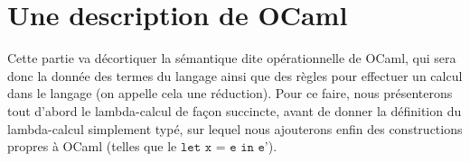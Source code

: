 \part{Une description de OCaml}

Cette partie va décortiquer la sémantique dite opérationnelle de OCaml, qui sera donc la donnée des termes du langage ainsi que des règles pour effectuer un calcul dans le langage (on appelle cela une réduction). Pour ce faire, nous présenterons tout d'abord le lambda-calcul de façon succincte, avant de donner la définition du lambda-calcul simplement typé, sur lequel nous ajouterons enfin des constructions propres à OCaml (telles que le $\texttt{let x = e in e'}$).








